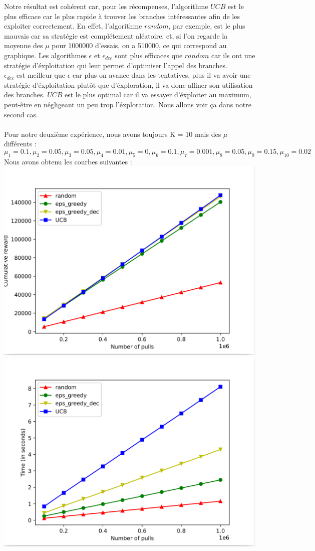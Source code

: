 \documentclass[a4paper, 12pt]{article}
\begin{document}
Notre résultat est cohérent car, pour les récompenses, l'algorithme $\textit{UCB}$ est le plus efficace car le plus rapide à trouver les branches intéressantes afin de les exploiter correctement.
En effet, l'algorithme $\textit{random}$, par exemple, est le plus mauvais car sa stratégie est complétement aléatoire, et, si l'on regarde la moyenne des $\mu$ pour 1000000 d'essais, on a 510000, ce qui correspond au graphique.
Les algorithmes $\epsilon$ et $\epsilon_{dec}$ sont plus efficaces que $\textit{random}$ car ils ont une stratégie d'éxploitation qui leur permet d'optimiser l'appel des branches. 
\\$\epsilon_{dec}$ est meilleur que $\epsilon$ car plus on avance dans les tentatives, plus il va avoir une stratégie d'éxploitation plutôt que d'éxploration, il va donc affiner son utilisation des branches. 
$\textit{UCB}$ est le plus optimal car il va essayer d'éxploiter au maximum, peut-être en négligeant un peu trop l'éxploration. Nous allons voir ça dans notre second cas.
\\\\
Pour notre deuxième expérience, nous avons toujours K = 10 mais des $\mu$ différents :
\[\mu_1=0.1,\mu_2=0.05,\mu_3=0.05,\mu_4=0.01,\mu_5=0,\mu_6=0.1,\mu_7=0.001,\mu_8=0.05,\mu_9=0.15,\mu_{10}=0.02\]
Nous avons obtenu les courbes suivantes :\\
\includegraphics[scale=0.19]{screen_reward_petit_mu.png}
\includegraphics[scale=0.19]{screen_time_petit_mu.png}
\end{document}
